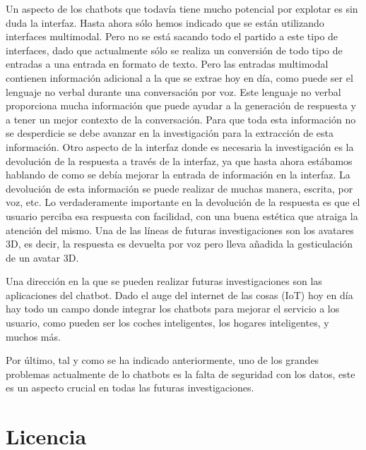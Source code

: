 Un aspecto de los chatbots que todavía tiene mucho potencial por explotar es sin duda la interfaz. Hasta ahora sólo hemos indicado que se están utilizando interfaces multimodal. Pero no se está sacando todo el partido a este tipo de interfaces, dado que actualmente sólo se realiza un conversión de todo tipo de entradas a una entrada en formato de texto. Pero las entradas multimodal contienen información adicional a la que se extrae hoy en día, como puede ser el lenguaje no verbal durante una conversación por voz. Este lenguaje no verbal proporciona mucha información que puede ayudar a la generación de respuesta y a tener un mejor contexto de la conversación. Para que toda esta información no se desperdicie se debe avanzar en la investigación para la extracción de esta información. Otro aspecto de la interfaz donde es necesaria la investigación es la devolución de la respuesta a través de la interfaz, ya que hasta ahora estábamos hablando de como se debía mejorar la entrada de información en la interfaz. La devolución de esta información se puede realizar de muchas manera, escrita, por voz, etc. Lo verdaderamente importante en la devolución de la respuesta es que el usuario perciba esa respuesta con facilidad, con una buena estética que atraiga la atención del mismo. Una de las líneas de futuras investigaciones son los avatares 3D, es decir, la respuesta es devuelta por voz pero lleva añadida la gesticulación de un avatar 3D.

Una dirección en la que se pueden realizar futuras investigaciones son las aplicaciones del chatbot. Dado el auge del internet de las cosas (IoT) hoy en día hay todo un campo donde integrar los chatbots para mejorar el servicio a los usuario, como pueden ser los coches inteligentes, los hogares inteligentes, y muchos más.

Por último, tal y como se ha indicado anteriormente, uno de los grandes problemas actualmente de lo chatbots es la falta de seguridad con los datos, este es un aspecto crucial en todas las futuras investigaciones.






\section{Licencia}


